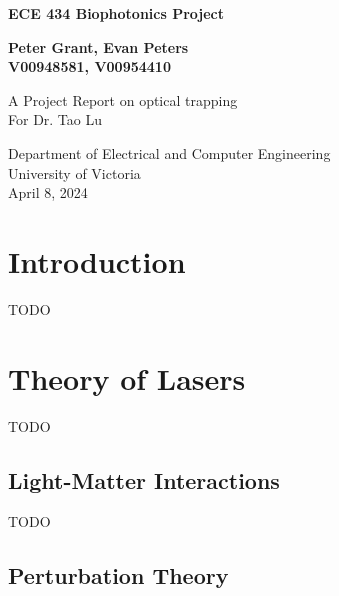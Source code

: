 \documentclass{article}
\begin{document}
\begin{titlepage}
    \begin{center}
        \vspace*{2cm}
 
        \huge
        \textbf{ECE 434 Biophotonics Project}
     
        \vspace{1.5cm}
        \Large
        \textbf{Peter Grant, Evan Peters\\
        V00948581, V00954410}
 
        \vfill
             
        A Project Report on optical trapping\\
        For Dr. Tao Lu     

        \vspace{0.8cm}
      

             
        Department of Electrical and Computer Engineering\\
        University of Victoria\\
        April 8, 2024
             
    \end{center}
\end{titlepage}


\tableofcontents
\newpage

\section*{Introduction}

TODO

\section*{Theory of Lasers}

TODO

\subsection*{Light-Matter Interactions}

TODO

\subsection*{Perturbation Theory}
\end{document}
